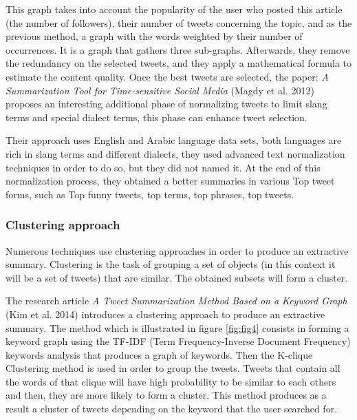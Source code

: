 \documentclass[runningheads]{llncs}
\begin{document}
This graph takes into account the popularity of the user who posted this
article (the number of followers), their number of tweets concerning the topic,
and as the previous method, a graph with the words weighted by their number of
occurrences. It is a graph that gathers three sub-graphs. Afterwards, they
remove the redundancy on the selected tweets, and they apply a mathematical
formula to estimate the content quality. Once the best tweets are selected, the
paper: \textit{A Summarization Tool for Time-sensitive Social Media} (Magdy et
al. 2012)\cite{magdy_summarization_2012} proposes an interesting additional
phase of normalizing tweets to limit slang terms and special dialect terms,
this phase can enhance tweet selection.

Their approach uses English and Arabic language data sets, both languages are
rich in slang terms and different dialects, they used advanced text
normalization techniques in order to do so, but they did not named it. At the
end of this normalization process, they obtained a better summaries in various
Top tweet forms, such as Top funny tweets, top terms, top phrases, top tweets.

\subsubsection{Clustering approach}

Numerous techniques use clustering approaches in order to
produce an extractive summary. Clustering is the task of grouping a set of
objects (in this context it will be a set of tweets) that are similar. The
obtained subsets will form a cluster.

The research article \textit{A Tweet Summarization Method Based on a Keyword
Graph} (Kim et al. 2014) \cite{kim_tweet_2014} introduces a clustering approach
to produce an extractive summary. The method which is illustrated in figure
\ref{fig:fig4} consists in forming a keyword graph using the TF-IDF (Term
Frequency-Inverse Document Frequency) keywords analysis that produces a graph
of keywords. Then the K-clique Clustering method is used in order to group the
tweets. Tweets that contain all the words of that clique will have high
probability to be similar to each others and then, they are more likely to form
a cluster. This method produces as a result a cluster of tweets depending on
the keyword that the user searched for.
\end{document}
